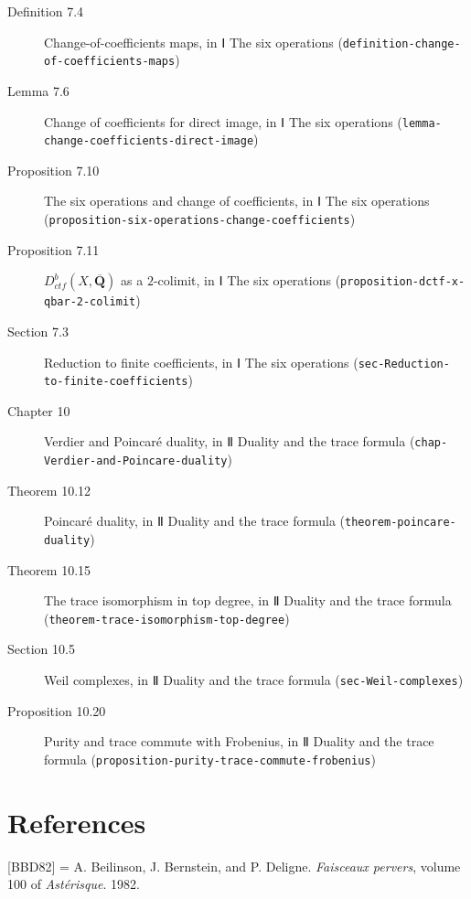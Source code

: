 \documentclass[11pt]{article}
\newcommand{\bpslug}[1]{\texttt{#1}}
\newcommand{\bpbibitem}[3]{\par\setbox0\hbox{[#1]\enspace}\ifdim\wd0<5em\setbox0\hbox to 5em{[#1]\hfil}\fi
  \hangindent=\wd0 \hangafter=1 \noindent\box0\phantomsection\label{#2}#3\par\smallskip}
\providecommand{\Dctf}{}\renewcommand{\Dctf}{D^b_{ctf}}
\providecommand{\Qbar}{}\renewcommand{\Qbar}{\overline{\mathbf Q}}
\begin{document}
\begin{description}
\item[Definition 7.4] Change-of-coefficients maps, in Ⅰ The six operations (\bpslug{definition-{}\allowbreak{}change-{}\allowbreak{}of-{}\allowbreak{}coefficients-{}\allowbreak{}maps})
\item[Lemma 7.6] Change of coefficients for direct image, in Ⅰ The six operations (\bpslug{lemma-{}\allowbreak{}change-{}\allowbreak{}coefficients-{}\allowbreak{}direct-{}\allowbreak{}image})
\item[Proposition 7.10] The six operations and change of coefficients, in Ⅰ The six operations (\bpslug{proposition-{}\allowbreak{}six-{}\allowbreak{}operations-{}\allowbreak{}change-{}\allowbreak{}coefficients})
\item[Proposition 7.11] $\Dctf(X,\Qbar)$ as a $2$-colimit, in Ⅰ The six operations (\bpslug{proposition-{}\allowbreak{}dctf-{}\allowbreak{}x-{}\allowbreak{}qbar-{}\allowbreak{}2-{}\allowbreak{}colimit})
\item[Section 7.3] Reduction to finite coefficients, in Ⅰ The six operations (\bpslug{sec-{}\allowbreak{}Reduction-{}\allowbreak{}to-{}\allowbreak{}finite-{}\allowbreak{}coefficients})
\item[Chapter 10] Verdier and Poincaré duality, in Ⅱ Duality and the trace formula (\bpslug{chap-{}\allowbreak{}Verdier-{}\allowbreak{}and-{}\allowbreak{}Poincare-{}\allowbreak{}duality})
\item[Theorem 10.12] Poincaré duality, in Ⅱ Duality and the trace formula (\bpslug{theorem-{}\allowbreak{}poincare-{}\allowbreak{}duality})
\item[Theorem 10.15] The trace isomorphism in top degree, in Ⅱ Duality and the trace formula (\bpslug{theorem-{}\allowbreak{}trace-{}\allowbreak{}isomorphism-{}\allowbreak{}top-{}\allowbreak{}degree})
\item[Section 10.5] Weil complexes, in Ⅱ Duality and the trace formula (\bpslug{sec-{}\allowbreak{}Weil-{}\allowbreak{}complexes})
\item[Proposition 10.20] Purity and trace commute with Frobenius, in Ⅱ Duality and the trace formula (\bpslug{proposition-{}\allowbreak{}purity-{}\allowbreak{}trace-{}\allowbreak{}commute-{}\allowbreak{}frobenius})
\end{description}
\clearpage{}%
\section*{References}
\bpbibitem{BBD82}{bp100}{A. Beilinson, J. Bernstein, and P. Deligne. \emph{Faisceaux pervers}, volume 100 of \emph{Astérisque}. 1982.}
\end{document}
